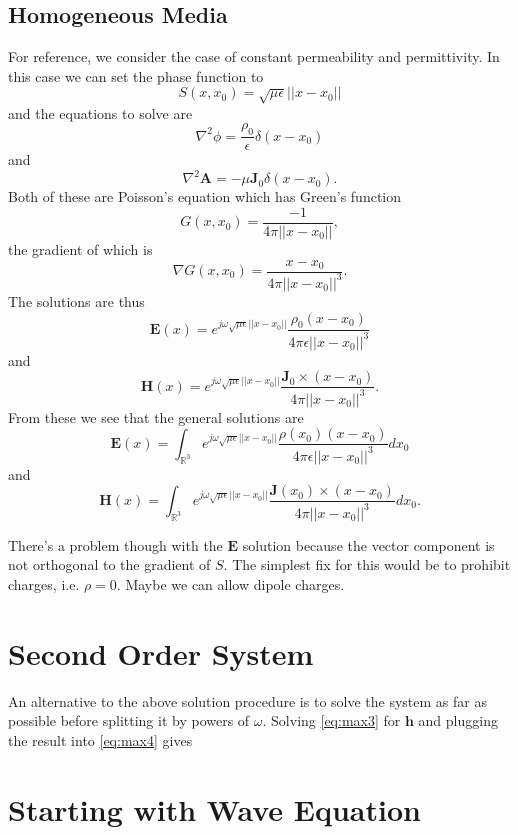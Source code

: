 \documentclass{article}
\newcommand{\norm}[1]{||#1||}
\theoremstyle{plain}
\begin{document}
\subsection{Homogeneous Media}

For reference, we consider the case of constant permeability and permittivity. In this case we can set the phase function to
\begin{equation}
	S(x,x_0) = \sqrt{\mu\epsilon}\norm{x-x_0}
\end{equation}
and the equations to solve are
\begin{equation}
	\nabla^2\phi = \frac{\rho_0}{\epsilon}\delta(x-x_0)
\end{equation}
and
\begin{equation}
	\nabla^2\mathbf{A} = -\mu\mathbf{J}_0\delta(x-x_0).
\end{equation}
Both of these are Poisson's equation which has Green's function
\begin{equation}
	G(x,x_0) = \frac{-1}{4\pi\norm{x-x_0}},
\end{equation}
the gradient of which is
\begin{equation}
	\nabla G(x,x_0) = \frac{x-x_0}{4\pi\norm{x-x_0}^3}.
\end{equation}
The solutions are thus
\begin{equation}
	\mathbf{E}(x) = e^{j\omega\sqrt{\mu\epsilon}\norm{x-x_0}}\frac{\rho_0(x-x_0)}{4\pi\epsilon\norm{x-x_0}^3}
\end{equation}
and
\begin{equation}
	\mathbf{H}(x) = e^{j\omega\sqrt{\mu\epsilon}\norm{x-x_0}}\frac{\mathbf{J}_0\times(x-x_0)}{4\pi\norm{x-x_0}^3}.
\end{equation}
From these we see that the general solutions are
\begin{equation}
	\mathbf{E}(x) = \int_{\mathbb{R}^3} e^{j\omega\sqrt{\mu\epsilon}\norm{x-x_0}}\frac{\rho(x_0)(x-x_0)}{4\pi\epsilon\norm{x-x_0}^3} dx_0
\end{equation}
and
\begin{equation}
	\mathbf{H}(x) = \int_{\mathbb{R}^3} e^{j\omega\sqrt{\mu\epsilon}\norm{x-x_0}}\frac{\mathbf{J}(x_0)\times(x-x_0)}{4\pi\norm{x-x_0}^3} dx_0.
\end{equation}

There's a problem though with the $\mathbf{E}$ solution because the vector component is not orthogonal to the gradient of $S$.
The simplest fix for this would be to prohibit charges, i.e. $\rho=0$. Maybe we can allow dipole charges.



\section{Second Order System}

An alternative to the above solution procedure is to solve the system as far as possible before splitting it by powers of $\omega$.
Solving \eqref{eq:max3} for $\mathbf{h}$ and plugging the result into \eqref{eq:max4} gives



\section{Starting with Wave Equation}
\end{document}
